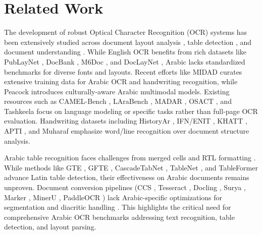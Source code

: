 \section{Related Work}
The development of robust Optical Character Recognition (OCR) systems has been extensively studied across document layout analysis \cite{zhao2024doclayout, shen2021layoutparser, paruchuri2024surya, easyocr, auer2024docling, li2020docbank}, table detection \cite{li2019tablebank, paliwal2019tablenet, nassar2022tableformer, li2021gfte, schreiber2017deepdesrt}, and document understanding \cite{staar2018corpus, weber2023wordscape, livathinos2021robust}. While English OCR benefits from rich datasets like PubLayNet \cite{zhong2019publaynet}, DocBank \cite{li2020docbank}, M6Doc \cite{cheng2023m6doc}, and DocLayNet \cite{doclaynet2022}, Arabic lacks standardized benchmarks for diverse fonts and layouts. Recent efforts like MIDAD \cite{bhatia2024qalam} curates extensive training data for Arabic OCR and handwriting recognition, while Peacock \cite{alwajih2024peacock} introduces culturally-aware Arabic multimodal models. Existing resources such as CAMEL-Bench \cite{ghaboura2024camel}, LAraBench \cite{abdelali2023larabench}, MADAR \cite{bouamor2018madar}, OSACT \cite{mubarak2022overview}, and Tashkeela \cite{zerrouki2017tashkeela} focus on language modeling or specific tasks rather than full-page OCR evaluation. Handwriting datasets including HistoryAr \cite{pantke2014historical}, IFN/ENIT \cite{pechwitz2002ifn}, KHATT \cite{mahmoud2014khatt}, APTI \cite{slimane2009new}, and Muharaf \cite{saeed2024muharaf} emphasize word/line recognition over document structure analysis.



\noindent Arabic table recognition faces challenges from merged cells and RTL formatting \cite{pantke2014historical}. While methods like GTE \cite{zheng2021global}, GFTE \cite{li2021gfte}, CascadeTabNet \cite{prasad2020cascadetabnet}, TableNet \cite{paliwal2019tablenet}, and TableFormer \cite{nassar2022tableformer} advance Latin table detection, their effectiveness on Arabic documents remains unproven. Document conversion pipelines (CCS \cite{staar2018corpus}, Tesseract \cite{smith2007overviewtesseract}, Docling \cite{auer2024docling}, Surya \cite{paruchuri2024surya}, Marker \cite{paruchuri2024marker}, MinerU \cite{wang2024mineru}, PaddleOCR \cite{du2020paddleocr}) lack Arabic-specific optimizations for segmentation and diacritic handling \cite{mahmoud2018online, badam2024benjamin}. This highlights the critical need for comprehensive Arabic OCR benchmarks addressing text recognition, table detection, and layout parsing.